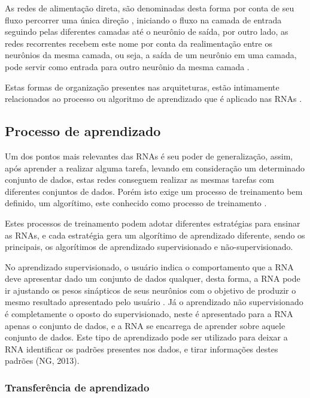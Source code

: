 As redes de alimentação direta, são denominadas desta forma por conta de seu fluxo percorrer uma única direção \cite{Cintra2019}, iniciando o fluxo na camada de entrada seguindo pelas diferentes camadas até o neurônio de saída, por outro lado, as redes recorrentes recebem este nome por conta da realimentação entre os neurônios da mesma camada, ou seja, a saída de um neurônio em uma camada, pode servir como entrada para outro neurônio da mesma camada \cite{Nelson2017}.

Estas formas de organização presentes nas arquiteturas, estão intimamente relacionados ao processo ou algoritmo de aprendizado que é aplicado nas RNAs \cite{Haykin2001}.

\subsection{Processo de aprendizado}

Um dos pontos mais relevantes das RNAs é seu poder de generalização, assim, após aprender a realizar alguma tarefa, levando em consideração um determinado conjunto de dados, estas redes conseguem realizar as mesmas tarefas com diferentes conjuntos de dados. Porém isto exige um processo de treinamento bem definido, um algorítimo, este conhecido como processo de treinamento \cite{livroNunes2016}.

Estes processos de treinamento podem adotar diferentes estratégias para ensinar as RNAs, e cada estratégia gera um algorítimo de aprendizado diferente, sendo os principais, os algorítimos de aprendizado supervisionado e não-supervisionado.

No aprendizado supervisionado, o usuário indica o comportamento que a RNA deve apresentar dado um conjunto de dados qualquer, desta forma, a RNA pode ir ajustando os pesos sinápticos de seus neurônios com o objetivo de produzir o mesmo resultado apresentado pelo usuário \cite{Osorio1999}. Já o aprendizado não supervisionado é completamente o oposto do supervisionado, neste é apresentado para a RNA apenas o conjunto de dados, e a RNA se encarrega de aprender sobre aquele conjunto de dados. Este tipo de aprendizado pode ser utilizado para deixar a RNA identificar os padrões presentes nos dados, e tirar informações destes padrões (NG, 2013). 

\subsubsection{Transferência de aprendizado}

